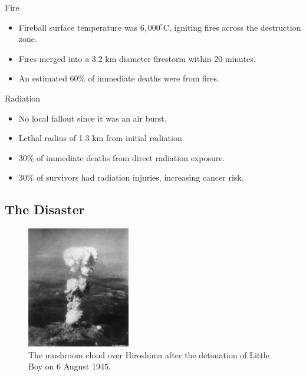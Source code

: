 \documentclass{loyola-beamer}
\begin{document}
\begin{frame}{Fire}
	\begin{itemize}
		\item Fireball surface temperature was $6,000^\circ$C, igniting fires across the destruction zone.
		\item Fires merged into a 3.2 km diameter firestorm within 20 minutes.
		\item An estimated 60\% of immediate deaths were from fires.
	\end{itemize}
\end{frame}

\begin{frame}{Radiation}
	\begin{itemize}
		\item No local fallout since it was an air burst.
		\item Lethal radius of 1.3 km from initial radiation.
		\item 30\% of immediate deaths from direct radiation exposure.
		\item 30\% of survivors had radiation injuries, increasing cancer risk.
	\end{itemize}
\end{frame}

\subsection{The Disaster}

\begin{frame}
	\begin{figure}
		\begin{center}
			\includegraphics[width=0.4\textwidth]{figures/Atomic_cloud_over_Hiroshima_-_NARA_542192_-_Edit.jpg}
		\end{center}
		\caption{The mushroom cloud over Hiroshima after the detonation of Little Boy on 6 August 1945.}
	\end{figure}
\end{frame}
\end{document}
